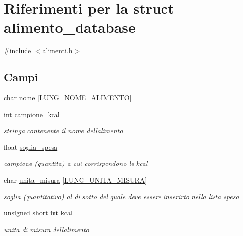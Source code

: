 \hypertarget{structalimento__database}{}\section{Riferimenti per la struct alimento\+\_\+database}
\label{structalimento__database}


{\ttfamily \#include $<$alimenti.\+h$>$}

\subsection*{Campi}
\begin{DoxyCompactItemize}
\item 
char \hyperlink{structalimento__database_af5fe965d970d03536e84e3987e1eead6}{nome} \mbox{[}\hyperlink{alimenti_8h_af503a16b1a63b47d6a5b2edd94b5caf2}{L\+U\+N\+G\+\_\+\+N\+O\+M\+E\+\_\+\+A\+L\+I\+M\+E\+N\+TO}\mbox{]}
\item 
int \hyperlink{structalimento__database_a1ed319f42c0754032113f2fbacd7b8d5}{campione\+\_\+kcal}
\begin{DoxyCompactList}\small\item\em stringa contenente il nome dell\textquotesingle{}alimento \end{DoxyCompactList}\item 
float \hyperlink{structalimento__database_a545f9ae518600e95e3c1a41f830c390f}{soglia\+\_\+spesa}
\begin{DoxyCompactList}\small\item\em campione (quantita) a cui corrispondono le kcal \end{DoxyCompactList}\item 
char \hyperlink{structalimento__database_acb4c2e16b5b64a473dfd389ccab96a8e}{unita\+\_\+misura} \mbox{[}\hyperlink{alimenti_8h_ade0f1f034a3ec6c04b8e29f4730db983}{L\+U\+N\+G\+\_\+\+U\+N\+I\+T\+A\+\_\+\+M\+I\+S\+U\+RA}\mbox{]}
\begin{DoxyCompactList}\small\item\em soglia (quantitativo) al di sotto del quale deve essere inserirto nella lista spesa \end{DoxyCompactList}\item 
unsigned short int \hyperlink{structalimento__database_a219362a012c3a468cfbbdfe9a9f36222}{kcal}
\begin{DoxyCompactList}\small\item\em unita di misura dell\textquotesingle{}alimento \end{DoxyCompactList}\end{DoxyCompactItemize}


